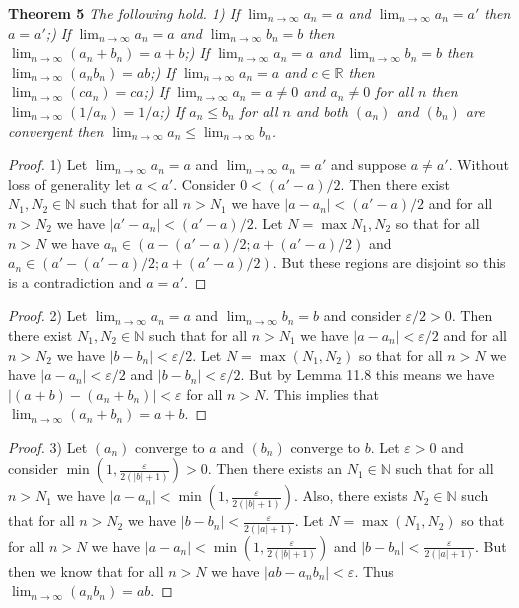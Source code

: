 \documentclass{article}
\begin{document}
\begin{flushleft}
\textbf{Theorem 5}
\textsl{The following hold.
1) If $\lim_{n \rightarrow \infty} a_n = a$ and $\lim_{n \rightarrow \infty} a_n = a'$ then $a=a'$;) If $\lim_{n \rightarrow \infty} a_n = a$ and $\lim_{n \rightarrow \infty} b_n = b$ then $\lim_{n \rightarrow \infty} (a_n + b_n) = a+b$;) If $\lim_{n \rightarrow \infty} a_n = a$ and $\lim_{n \rightarrow \infty} b_n = b$ then $\lim_{n \rightarrow \infty} (a_n b_n) = ab$;) If $\lim_{n \rightarrow \infty} a_n = a$ and $c \in \mathbb{R}$ then $\lim_{n \rightarrow \infty} (ca_n) = ca$;) If $\lim_{n \rightarrow \infty} a_n = a \neq 0$ and $a_n \neq 0$ for all $n$ then $\lim_{n \rightarrow \infty} (1 / a_n) = 1/a$;) If $a_n \leq b_n$ for all $n$ and both $(a_n)$ and $(b_n)$ are convergent then $\lim_{n \rightarrow \infty} a_n \leq \lim_{n \rightarrow \infty} b_n$.}
\begin{proof}
1) Let $\lim_{n \rightarrow \infty} a_n = a$ and $\lim_{n \rightarrow \infty} a_n = a'$ and suppose $a \neq a'$. Without loss of generality let $a<a'$. Consider $0 < (a'-a)/2$. Then there exist $N_1, N_2 \in \mathbb{N}$ such that for all $n>N_1$ we have $|a-a_n| < (a'-a)/2$ and for all $n>N_2$ we have $|a'-a_n| < (a'-a)/2$. Let $N = \max{N_1,N_2}$ so that for all $n>N$ we have $a_n \in (a-(a'-a)/2 ; a + (a'-a)/2)$ and $a_n \in (a'-(a'-a)/2 ; a + (a'-a)/2)$. But these regions are disjoint so this is a contradiction and $a = a'$.
\end{proof}
\begin{proof}
2) Let $\lim_{n \rightarrow \infty} a_n = a$ and $\lim_{n \rightarrow \infty} b_n = b$ and consider $\varepsilon/2 > 0$. Then there exist $N_1, N_2 \in \mathbb{N}$ such that for all $n > N_1$ we have $|a-a_n| < \varepsilon/2$ and for all $n > N_2$ we have $|b-b_n| < \varepsilon/2$. Let $N = \max (N_1,N_2)$ so that for all $n>N$ we have $|a-a_n| < \varepsilon/2$ and $|b-b_n| < \varepsilon/2$. But by Lemma 11.8 this means we have $|(a+b) - (a_n+b_n)| < \varepsilon$ for all $n>N$. This implies that $\lim_{n \rightarrow \infty} (a_n+b_n) = a+b$.
\end{proof}
\begin{proof}
3) Let $(a_n)$ converge to $a$ and $(b_n)$ converge to $b$. Let $\varepsilon > 0$ and consider $\min \left ( 1, \frac{\varepsilon}{2 (|b|+1)} \right ) > 0$. Then there exists an $N_1 \in \mathbb{N}$ such that for all $n>N_1$ we have $|a-a_n| < \min \left (1, \frac{\varepsilon}{2 (|b| + 1)} \right )$. Also, there exists $N_2 \in \mathbb{N}$ such that for all $n>N_2$ we have $|b-b_n| < \frac{\varepsilon}{2 (|a|+1)}$. Let $N= \max(N_1,N_2)$ so that for all $n>N$ we have $|a-a_n| < \min \left (1, \frac{\varepsilon}{2(|b|+1)} \right )$ and $|b-b_n| < \frac{\varepsilon}{2(|a|+1)}$. But then we know that for all $n>N$ we have $|ab-a_nb_n| < \varepsilon$. Thus $\lim_{n \rightarrow \infty} (a_nb_n) = ab$.

\end{proof}
\end{flushleft}
\end{document}
